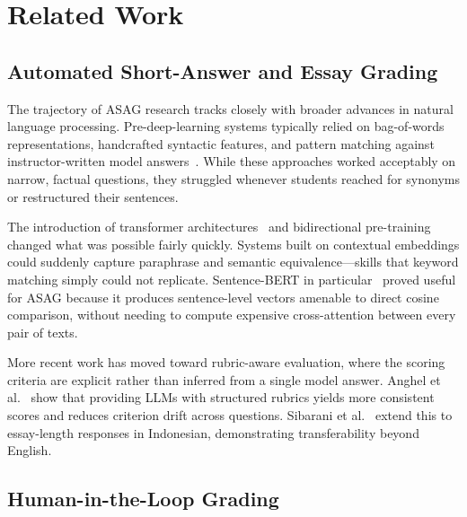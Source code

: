 \documentclass[conference]{IEEEtran}
\begin{document}
\section{Related Work}

\subsection{Automated Short-Answer and Essay Grading}

The trajectory of ASAG research tracks closely with broader
advances in natural language processing. Pre-deep-learning systems
typically relied on bag-of-words representations, handcrafted
syntactic features, and pattern matching against instructor-written
model answers~\cite{murff2025}. While these approaches worked
acceptably on narrow, factual questions, they struggled whenever
students reached for synonyms or restructured their sentences.

The introduction of transformer architectures~\cite{vaswani2017}
and bidirectional pre-training~\cite{devlin2018} changed what was
possible fairly quickly. Systems built on contextual embeddings
could suddenly capture paraphrase and semantic equivalence---skills
that keyword matching simply could not replicate. Sentence-BERT
in particular~\cite{reimers2019} proved useful for ASAG because
it produces sentence-level vectors amenable to direct cosine
comparison, without needing to compute expensive cross-attention
between every pair of texts.

More recent work has moved toward rubric-aware evaluation, where the
scoring criteria are explicit rather than inferred from a single
model answer. Anghel et al.~\cite{anghel2025} show that providing
LLMs with structured rubrics yields more consistent scores and
reduces criterion drift across questions. Sibarani et
al.~\cite{sibarani2025} extend this to essay-length responses in
Indonesian, demonstrating transferability beyond English.

\subsection{Human-in-the-Loop Grading}
\end{document}
